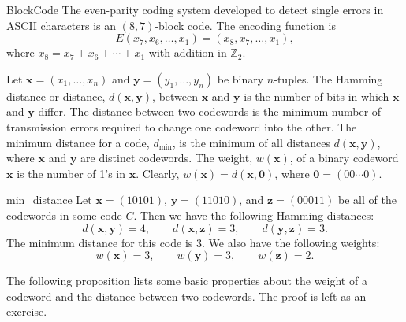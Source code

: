  
\begin{example}{BlockCode}
The even-parity coding system developed to detect single errors in
ASCII characters is an $(8,7)$-block code. The encoding function is
\[
E(x_7, x_6, \ldots, x_1) = (x_8, x_7,  \ldots, x_1),
\]
where $x_8 = x_7 + x_6 + \cdots + x_1$ with addition in ${\mathbb Z}_2$. 
\end{example}
 

 
Let ${\mathbf x} = (x_1, \ldots, x_n)$ and ${\mathbf y} = (y_1, \ldots,
y_n)$ be binary $n$-tuples. The {\bfi Hamming distance\/} or {\bfi distance}, $d({\mathbf x}, {\mathbf
y})$\label{noteHammingdist}, between ${\mathbf x}$ and ${\mathbf y}$ is
the number of bits in which ${\mathbf x}$ and ${\mathbf y}$ differ. The
distance between two codewords is the minimum number of transmission
errors required to change one codeword into the other. The
{\bfi minimum distance\/} for a code,
$d_{\min}$\label{notemindist}, is the minimum of all distances
$d({\mathbf x}, {\mathbf y})$, where ${\mathbf x}$ and ${\mathbf y}$ are
distinct codewords. The {\bfi weight},
$w({\mathbf x})$\label{noteweight}, of a binary codeword ${\mathbf x}$ is
the number of 1's in ${\mathbf x}$. Clearly, $w({\mathbf x}) = d({\mathbf
x}, {\mathbf 0})$, where ${\mathbf 0} = (00 \cdots 0)$. 
 
 
\begin{example}{min_distance}
Let ${\mathbf x} = (10101)$, ${\mathbf y} = (11010)$, and ${\mathbf z} =
(00011)$ be all of the codewords in some code $C$. Then we have the
following Hamming distances: 
\[
d({\mathbf x},{\mathbf y}) = 4, \qquad
d({\mathbf x},{\mathbf z}) = 3, \qquad
d({\mathbf y},{\mathbf z}) = 3.
\]
The minimum distance  for this code is 3. We also have the
following weights: 
\[
w({\mathbf x}) = 3, \qquad
w({\mathbf y}) = 3, \qquad
w({\mathbf z}) = 2.
\]
\end{example}
 
 
The following proposition lists some basic properties about the weight
of a codeword and the distance between two codewords. The proof is
left as an exercise.
 
